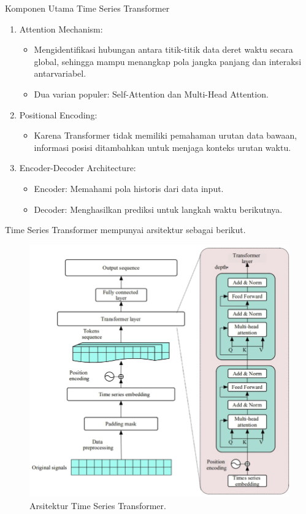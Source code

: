 Komponen Utama Time Series Transformer
\begin{enumerate}
    \item Attention Mechanism:
    \begin{itemize}
        \item Mengidentifikasi hubungan antara titik-titik data deret waktu secara global, sehingga mampu menangkap pola jangka panjang dan interaksi antarvariabel.
        \item Dua varian populer: Self-Attention dan Multi-Head Attention.
    \end{itemize}
    \item Positional Encoding:
    \begin{itemize}
        \item Karena Transformer tidak memiliki pemahaman urutan data bawaan, informasi posisi ditambahkan untuk menjaga konteks urutan waktu.
    \end{itemize}
    \item Encoder-Decoder Architecture:
     \begin{itemize}
        \item Encoder: Memahami pola historis dari data input.
        \item Decoder: Menghasilkan prediksi untuk langkah waktu berikutnya.
    \end{itemize}
    
\end{enumerate}
Time Series Transformer mempunyai arsitektur sebagai berikut.
\begin{figure} [H] \centering
  \includegraphics[scale=1.2]{gambar/gambar TST.png} 
    \caption{Arsitektur Time Series Transformer.}
    \label{fig:label_gambar}
\end{figure}
